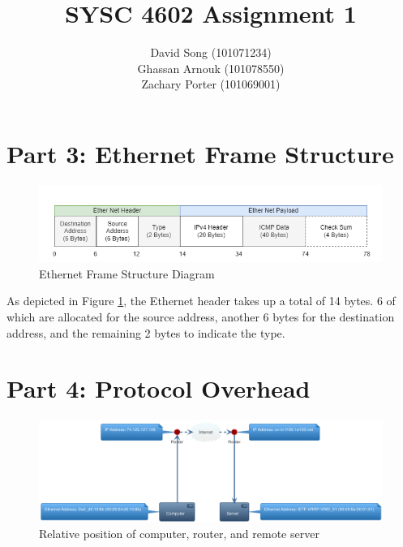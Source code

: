 \documentclass{article}
\begin{document}
    \title  { \textbf{SYSC 4602 Assignment 1} }
    \author {
        David Song (101071234)\\
        Ghassan Arnouk (101078550)\\
        Zachary Porter (101069001)
    }

    \maketitle

    \clearpage
    \section*{Part 3: Ethernet Frame Structure}
    \begin{figure}[htbp]
        \centering
        \includegraphics[width=\textwidth]{images/assignment3-part3.drawio.png}
        \caption{Ethernet Frame Structure Diagram}
        \label{fig:EthernetFrameStruct}
    \end{figure}
    As depicted in Figure \ref{fig:EthernetFrameStruct}, the Ethernet header takes up a total of 14 bytes. 6 of which are allocated for the source address, another 6 bytes for the destination address, and the remaining 2 bytes to indicate the type.

    \section*{Part 4: Protocol Overhead}
    \begin{figure}[htbp]
        \centering
        \includegraphics[width=\textwidth]{images/assignment3-part4.plantuml.png}
        \caption{Relative position of computer, router, and remote server}
    \end{figure}
\end{document}
